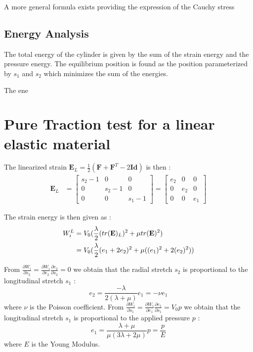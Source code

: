 \documentclass[a4paper,11pt]{article}
\newcommand{\strain}{{\mathbf E}}
\newcommand{\defGrad}{{\mathbf F}}
\newcommand{\identity}{\mathbf{Id}}
\begin{document}
A more general formula exists providing the expression of the Cauchy stress 

\subsection{Energy Analysis}
The total energy of the cylinder is given by the sum of the strain energy and the pressure energy. The equilibrium position is found as the position parameterized by $s_1$ and $s_2$ which minimizes the sum of the energies.

The ene

\section{Pure Traction test for a linear elastic material}

The linearized strain $\strain_L= \frac{1}{2}(\defGrad + \defGrad^T -2\identity)$ is then :
\begin{align*}
\strain_L  &=  \left [ \begin{array}{ccc} s_2-1 & 0 & 0 \\0 & s_2-1 & 0 \\ 0 & 0 & s_1-1 \end{array} \right ] =  \left [ \begin{array}{ccc} e_2 & 0 & 0 \\0 & e_2 & 0 \\ 0 & 0 & e_1 \end{array} \right ]
\end{align*}

The strain energy is then given as :
\begin{align*}
W_i^{L}&=V_0 (\frac{\lambda}{2}  (\trace \strain_L)^2 + \mu \trace \strain^2) \\
&=V_0 (\frac{\lambda}{2}  (e_1+2 e_2)^2 +\mu ((e_1)^2+2 (e_2)^2)) 
\end{align*}

From $\frac{\partial W_i}{\partial s_2} = \frac{\partial W_i}{\partial e_2}\frac{\partial e_2}{\partial s_2}= 0$ we obtain that the radial stretch $s_2$ is proportional to the longitudinal stretch $s_1$ :
\[
e_2 = \frac{-\lambda}{2(\lambda+\mu)} e_1 = -\nu e_1
\] where $\nu$ is the Poisson coefficient.
From $\frac{\partial W_i}{\partial s_1} = \frac{\partial W_i}{\partial e_1}\frac{\partial e_1}{\partial s_1}= V_0 p$ we obtain that the longitudinal stretch $s_1$ is proportional to the applied pressure $p$ :
\[
e_1 = \frac{\lambda+\mu}{\mu(3\lambda+2\mu)} p = \frac{p}{E} 
\] where $E$ is the Young Modulus.
\end{document}
